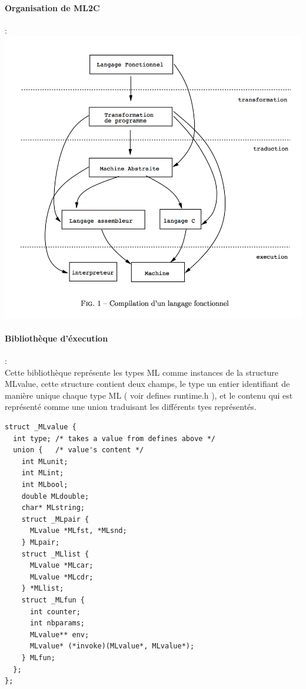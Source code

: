 \documentclass[a4paper, 11pt]{article}
\begin{document}
\paragraph{Organisation de ML2C} :\\
\includegraphics[scale=0.7]{organisation.png}

\paragraph{Biblioth\`eque d'\'execution } :\\
Cette bibliothèque représente les types ML comme instances de la structure MLvalue, cette structure contient deux champs, le type un entier identifiant de manière unique chaque type ML ( voir defines runtime.h ), et le contenu qui est représenté comme une union traduisant les différents tyes représentés.
\begin{lstlisting}
struct _MLvalue {
  int type; /* takes a value from defines above */
  union {   /* value's content */
    int MLunit;
    int MLint;
    int MLbool;
    double MLdouble;
    char* MLstring;
    struct _MLpair {
      MLvalue *MLfst, *MLsnd;
    } MLpair;
    struct _MLlist {
      MLvalue *MLcar;
      MLvalue *MLcdr;
    } *MLlist;
    struct _MLfun {
      int counter;
      int nbparams;
      MLvalue** env;
      MLvalue* (*invoke)(MLvalue*, MLvalue*);
    } MLfun;
  };
};
\end{lstlisting}
\end{document}
